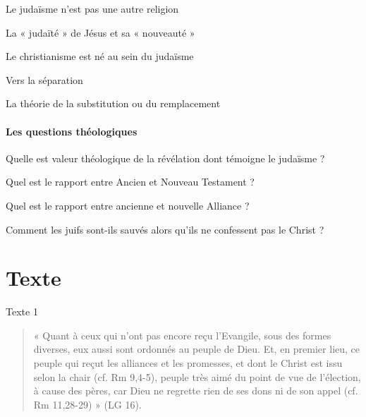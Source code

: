     
    \def\labelenumiii{\alph{enumiii}.}
    
      
      Le judaïsme n'est pas une autre religion
      
    
      
      La « judaïté » de Jésus et sa « nouveauté »
      
    
      
      Le christianisme est né au sein du judaïsme
      
    
      
      Vers la séparation
      
    
      
      La théorie de la substitution ou du remplacement
      
    
  
    
    \paragraph{Les questions théologiques}
    

    
    \def\labelenumiii{\alph{enumiii}.}
    
      
      Quelle est valeur théologique de la révélation dont témoigne le
      judaïsme ?
      
    
      
      Quel est le rapport entre Ancien et Nouveau Testament ?
      
    
      
      Quel est le rapport entre ancienne et nouvelle Alliance ?
      
    
      
      Comment les juifs sont-ils sauvés alors qu'ils ne confessent pas
      le Christ ?
      
    
  
\section{Texte}

Texte  1

\begin{quote}
    «  Quant  à  ceux  qui  n’ont  pas  encore  reçu  l’Evangile,  sous  des  formes  diverses,  eux  aussi  sont ordonnés  au  peuple  de  Dieu.  Et,  en  premier  lieu,  ce  peuple  qui  reçut  les  alliances  et  les promesses,  et  dont  le  Christ  est  issu  selon  la  chair  (cf.  Rm  9,4-5),  peuple  très  aimé  du  point  de vue  de  l’élection,  à  cause  des  pères,  car  Dieu  ne  regrette  rien  de  ses  dons  ni  de  son  appel  (cf. Rm 11,28-29)  »  (LG  16). 
\end{quote}


